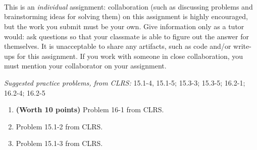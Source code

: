 \documentclass[letterpaper,11pt]{article}
\begin{document}


 \\

 \\
 \\

This is an \emph{individual} assignment: collaboration (such as discussing problems and brainstorming ideas for solving them) on this assignment is highly encouraged, but the work you submit must be your own. Give information only as a tutor would: ask questions so that your classmate is able to figure out the answer for themselves. It is unacceptable to share any artifacts, such as code and/or write-ups for this assignment. If you work with someone in close collaboration, you must mention your collaborator on your assignment.

\emph{Suggested practice problems, from CLRS:} 15.1-4, 15.1-5; 15.3-3; 15.3-5; 16.2-1; 16.2-4; 16.2-5

\begin{enumerate}
\item \textbf{(Worth 10 points)} Problem 16-1 from CLRS.
\item Problem 15.1-2 from CLRS.
\item Problem 15.1-3 from CLRS.

\end{enumerate}
\end{document}
